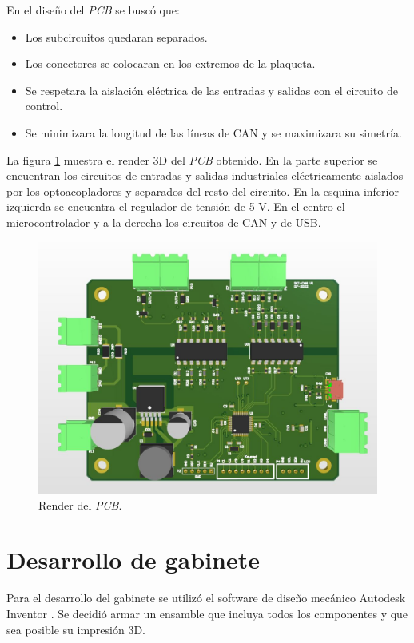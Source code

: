 En el diseño del \textit{PCB} se buscó que:
\begin{itemize}
	\item Los subcircuitos quedaran separados.
	\item Los conectores se colocaran en los extremos de la plaqueta.
	\item Se respetara la aislación eléctrica de las entradas y salidas con el circuito de control.
	\item Se minimizara la longitud de las líneas de CAN y se maximizara su simetría.
\end{itemize}

La figura \ref{fig:render_pcb} muestra el render 3D del \textit{PCB} obtenido. En la parte superior se encuentran los circuitos de entradas y salidas industriales eléctricamente aislados por los optoacopladores y separados del resto del circuito. En la esquina inferior izquierda se encuentra el regulador de tensión de 5 V. En el centro el microcontrolador y a la derecha los circuitos de CAN y de USB.

\begin{figure}[htbp]
	\centering
	\includegraphics[scale=.4]{./Figures/pcb_sch.JPG}
	\caption{Render del \textit{PCB}.}
	\label{fig:render_pcb}
\end{figure}

\section{Desarrollo de gabinete}

Para el desarrollo del gabinete se utilizó el software de diseño mecánico Autodesk Inventor \citep{web_inventor}. Se decidió armar un ensamble que incluya todos los componentes y que sea posible su impresión 3D.

